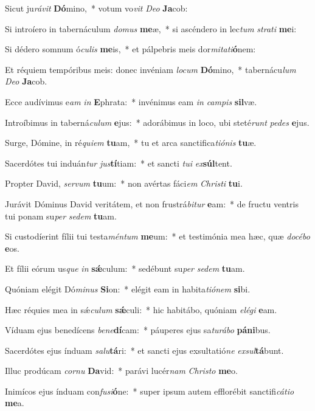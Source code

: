 \item Sicut ju\textit{rá}\textit{vit} \textbf{Dó}mino,~* votum vo\textit{vit} \textit{De}\textit{o} \textbf{Ja}cob:
\item Si introíero in tabernáculum \textit{do}\textit{mus} \textbf{me}æ,~* si ascéndero in lec\textit{tum} \textit{stra}\textit{ti} \textbf{me}i:
\item Si dédero somnum ó\textit{cu}\textit{lis} \textbf{me}is,~* et pálpebris meis dor\textit{mi}\textit{ta}\textit{ti}\textbf{ó}nem:
\item Et réquiem tempóribus meis: donec invéniam \textit{lo}\textit{cum} \textbf{Dó}mino,~* tabernácu\textit{lum} \textit{De}\textit{o} \textbf{Ja}cob.
\item Ecce audívimus e\textit{am} \textit{in} \textbf{E}phrata:~* invénimus eam \textit{in} \textit{cam}\textit{pis} \textbf{sil}væ.
\item Introíbimus in taberná\textit{cu}\textit{lum} \textbf{e}jus:~* adorábimus in loco, ubi steté\textit{runt} \textit{pe}\textit{des} \textbf{e}jus.
\item Surge, Dómine, in ré\textit{qui}\textit{em} \textbf{tu}am,~* tu et arca sanctifica\textit{ti}\textit{ó}\textit{nis} \textbf{tu}æ.
\item Sacerdótes tui induán\textit{tur} \textit{jus}\textbf{tí}tiam:~* et sancti \textit{tu}\textit{i} \textit{ex}\textbf{súl}tent.
\item Propter David, \textit{ser}\textit{vum} \textbf{tu}um:~* non avértas fáci\textit{em} \textit{Chris}\textit{ti} \textbf{tu}i.
\item Jurávit Dóminus David veritátem, et non frustrá\textit{bi}\textit{tur} \textbf{e}am:~* de fructu ventris tui ponam su\textit{per} \textit{se}\textit{dem} \textbf{tu}am.
\item Si custodíerint fílii tui testa\textit{mén}\textit{tum} \textbf{me}um:~* et testimónia mea hæc, quæ \textit{do}\textit{cé}\textit{bo} \textbf{e}os.
\item Et fílii eórum us\textit{que} \textit{in} \textbf{sǽ}culum:~* sedébunt su\textit{per} \textit{se}\textit{dem} \textbf{tu}am.
\item Quóniam elégit Dó\textit{mi}\textit{nus} \textbf{Si}on:~* elégit eam in habita\textit{ti}\textit{ó}\textit{nem} \textbf{si}bi.
\item Hæc réquies mea in sǽ\textit{cu}\textit{lum} \textbf{sǽ}culi:~* hic habitábo, quóniam \textit{e}\textit{lé}\textit{gi} \textbf{e}am.
\item Víduam ejus benedícens \textit{be}\textit{ne}\textbf{dí}cam:~* páuperes ejus sa\textit{tu}\textit{rá}\textit{bo} \textbf{pá}\textbf{ni}bus.
\item Sacerdótes ejus índuam \textit{sa}\textit{lu}\textbf{tá}ri:~* et sancti ejus exsultatió\textit{ne} \textit{ex}\textit{sul}\textbf{tá}bunt.
\item Illuc prodúcam \textit{cor}\textit{nu} \textbf{Da}vid:~* parávi lucér\textit{nam} \textit{Chris}\textit{to} \textbf{me}o.
\item Inimícos ejus índuam con\textit{fu}\textit{si}\textbf{ó}ne:~* super ipsum autem efflorébit sanctifi\textit{cá}\textit{ti}\textit{o} \textbf{me}a.

